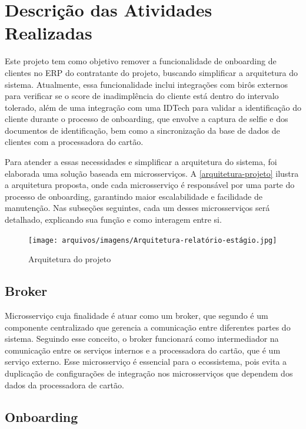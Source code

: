 \chapter{Descrição das Atividades Realizadas}
\label{cap:atividades}

Este projeto tem como objetivo remover a funcionalidade de onboarding de clientes no ERP
do contratante do projeto, buscando simplificar a arquitetura do sistema. 
Atualmente, essa funcionalidade inclui integrações com birôs externos para 
verificar se o score de inadimplência do cliente está dentro do intervalo tolerado, 
além de uma integração com uma IDTech para validar a identificação do cliente 
durante o processo de onboarding, que envolve a captura de selfie e dos documentos 
de identificação, bem como a sincronização da base de dados  de clientes com a 
processadora do cartão.

Para atender a essas necessidades e simplificar a arquitetura do sistema, 
foi elaborada uma solução baseada em microsserviços. 
A \autoref{arquitetura-projeto} ilustra a arquitetura proposta, 
onde cada microsserviço é responsável por uma parte do processo de onboarding, 
garantindo maior escalabilidade e facilidade de manutenção. Nas subseções seguintes, 
cada um desses microsserviços será detalhado, explicando sua 
função e como interagem entre si.


\begin{figure} [!h]
    \centering
    \caption{Arquitetura do projeto}
    \texttt{[image: arquivos/imagens/Arquitetura-relatório-estágio.jpg]}
    \label{arquitetura-projeto}
\end{figure}

\section{Broker}

Microsserviço cuja finalidade é atuar como um broker, que segundo \cite{distributed:systems:book} é um  
componente centralizado que gerencia a comunicação entre diferentes partes do sistema. 
Seguindo esse conceito, o broker funcionará como intermediador na comunicação entre os 
serviços internos e a processadora do cartão, que é um serviço externo. 
Esse microsserviço é essencial para o ecossistema, pois evita a duplicação de 
configurações de integração nos microsserviços que dependem dos dados da processadora 
de cartão.

\section{Onboarding}

